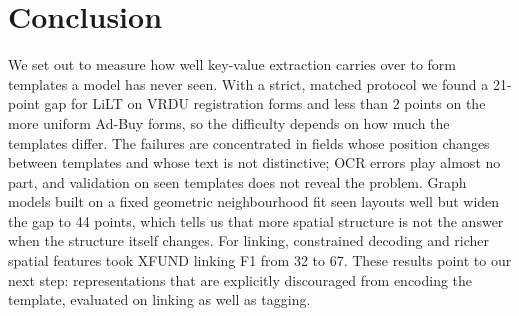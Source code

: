 \documentclass[11pt,a4paper]{article}
\begin{document}
\section{Conclusion}

We set out to measure how well key-value extraction carries over to form templates a model has never seen. With a strict, matched protocol we found a 21-point gap for LiLT on VRDU registration forms and less than 2 points on the more uniform Ad-Buy forms, so the difficulty depends on how much the templates differ. The failures are concentrated in fields whose position changes between templates and whose text is not distinctive; OCR errors play almost no part, and validation on seen templates does not reveal the problem. Graph models built on a fixed geometric neighbourhood fit seen layouts well but widen the gap to 44 points, which tells us that more spatial structure is not the answer when the structure itself changes. For linking, constrained decoding and richer spatial features took XFUND linking F1 from 32 to 67. These results point to our next step: representations that are explicitly discouraged from encoding the template, evaluated on linking as well as tagging.
\end{document}
